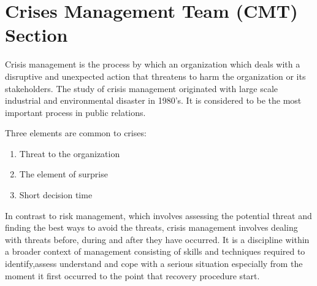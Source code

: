 \chapter{Crises Management Team (CMT) Section}

Crisis management is the process by which an organization which
deals with a disruptive and unexpected action that threatens to harm
the organization or its stakeholders. The study of crisis management
originated with large scale industrial and environmental disaster in
1980’s. It is considered to be the most important process in public
relations.

\vspace{1em}


Three elements are common to crises:

\begin{enumerate}

\item Threat to the organization

\item The element of surprise

\item Short decision time

\end{enumerate}



In contrast to risk management, which involves assessing the
potential threat and finding the best ways to avoid the threats, crisis
management involves dealing with threats before, during and after
they have occurred. It is a discipline within a broader context of
management consisting of skills and techniques required to identify,assess understand and cope with a serious situation especially from
the moment it first occurred to the point that recovery procedure start.